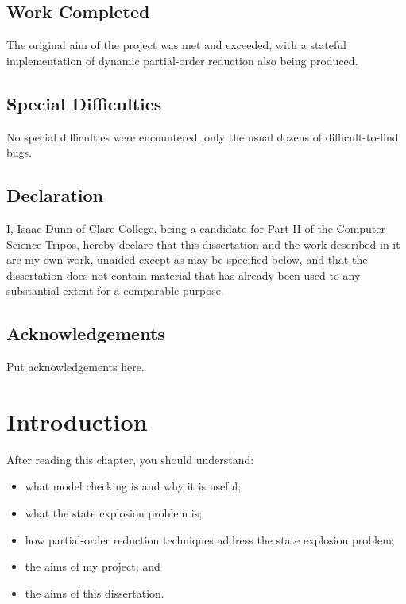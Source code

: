 \documentclass[12pt,a4paper,twoside,openright]{report}
\newenvironment{understandinglist}
	{\begin{itemize} \itemsep 0em}{\end{itemize}}
\begin{document}
\section*{Work Completed}

The original aim of the project was met and exceeded, with
a stateful implementation of dynamic partial-order reduction
also being produced.

\section*{Special Difficulties}

No special difficulties were encountered, only the usual dozens of
difficult-to-find bugs.
 
\newpage
\section*{Declaration}

I, Isaac Dunn of Clare College, being a candidate for Part II of the Computer
Science Tripos, hereby declare
that this dissertation and the work described in it are my own work,
unaided except as may be specified below, and that the dissertation
does not contain material that has already been used to any substantial
extent for a comparable purpose.

\bigskip
{}

\bigskip
{}

\tableofcontents

\listoffigures

\newpage
\section*{Acknowledgements}

Put acknowledgements here.


\pagestyle{headings}

\chapter{Introduction}
After reading this chapter,
you should understand:
\begin{understandinglist}
	\item what model checking is and why it is useful;
	\item what the state explosion problem is;
	\item how partial-order reduction
	techniques address the state explosion problem;
	\item the aims of my project; and
	\item the aims of this dissertation.
\end{understandinglist}
\end{document}
